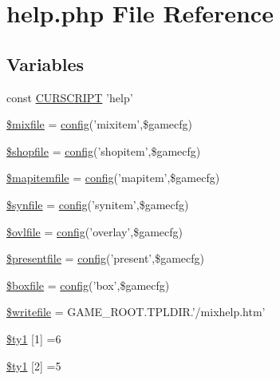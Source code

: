 \hypertarget{help_8php}{\section{help.\+php File Reference}
\label{help_8php}
}
\subsection*{Variables}
\begin{DoxyCompactItemize}
\item 
const \hyperlink{help_8php_a39c39f525eceb86cabc338804f230e80}{C\+U\+R\+S\+C\+R\+I\+P\+T} 'help'
\item 
\hyperlink{help_8php_affc0dbcabcc950d3d33132839350597f}{\$mixfile} = \hyperlink{global_8func_8php_a239de3ed26da8daceb8acacdcb03325d}{config}('mixitem',\$gamecfg)
\item 
\hyperlink{help_8php_afee43b66e7c378972cdfd311256e4bdc}{\$shopfile} = \hyperlink{global_8func_8php_a239de3ed26da8daceb8acacdcb03325d}{config}('shopitem',\$gamecfg)
\item 
\hyperlink{help_8php_a7d4a07d88fbf7598d1afe480b8e49aff}{\$mapitemfile} = \hyperlink{global_8func_8php_a239de3ed26da8daceb8acacdcb03325d}{config}('mapitem',\$gamecfg)
\item 
\hyperlink{help_8php_a9d7789f6dc6b5b0f0b0886cddef59993}{\$synfile} = \hyperlink{global_8func_8php_a239de3ed26da8daceb8acacdcb03325d}{config}('synitem',\$gamecfg)
\item 
\hyperlink{help_8php_adde37beebc46284ae993bf4053074066}{\$ovlfile} = \hyperlink{global_8func_8php_a239de3ed26da8daceb8acacdcb03325d}{config}('overlay',\$gamecfg)
\item 
\hyperlink{help_8php_a9294d83ef6d001ede9b5e9dc96eb2a62}{\$presentfile} = \hyperlink{global_8func_8php_a239de3ed26da8daceb8acacdcb03325d}{config}('present',\$gamecfg)
\item 
\hyperlink{help_8php_a185669cf7ba3b84b38b578700ea1ef04}{\$boxfile} = \hyperlink{global_8func_8php_a239de3ed26da8daceb8acacdcb03325d}{config}('box',\$gamecfg)
\item 
\hyperlink{help_8php_a7f36146362433df71ca7f7102705501a}{\$writefile} = G\+A\+M\+E\+\_\+\+R\+O\+O\+T.\+T\+P\+L\+D\+I\+R.'/mixhelp.\+htm'
\item 
\hyperlink{help_8php_a69efb4615ba59410b71c65f9e9257768}{\$ty1} \mbox{[}1\mbox{]} =6
\item 
\hyperlink{help_8php_a1f878b8e6b252d143bca0b8db51dbc7a}{\$ty1} \mbox{[}2\mbox{]} =5
\item 

\end{DoxyCompactItemize}
